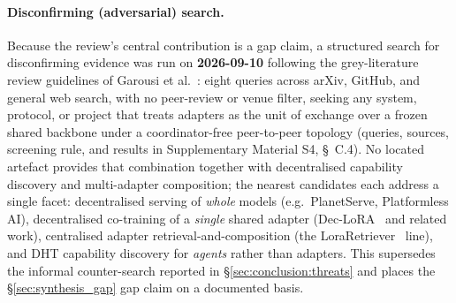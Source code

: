\paragraph{Disconfirming (adversarial) search.}
Because the review's central contribution is a gap claim, a structured search
for disconfirming evidence was run on \textbf{2026-09-10} following the
grey-literature review guidelines of Garousi et al.~\cite{Garousi2019}: eight
queries across arXiv, GitHub, and general web search, with no peer-review or
venue filter, seeking any system, protocol, or project that treats adapters as
the unit of exchange over a frozen shared backbone under a coordinator-free
peer-to-peer topology (queries, sources, screening rule, and results in
Supplementary Material S4, \S~C.4). No located artefact provides that
combination together with decentralised capability discovery and multi-adapter
composition; the nearest candidates each address a single facet:
decentralised serving of \emph{whole} models (e.g.\ PlanetServe, Platformless
AI), decentralised co-training of a \emph{single} shared adapter
(Dec-LoRA~\cite{Ghiasvand2025} and related work), centralised adapter
retrieval-and-composition (the LoraRetriever~\cite{ZhaoLoraRetriever2024}
line), and DHT capability discovery for \emph{agents} rather than adapters. This
supersedes the informal counter-search reported in
\S\ref{sec:conclusion:threats} and places the \S\ref{sec:synthesis_gap} gap
claim on a documented basis.

